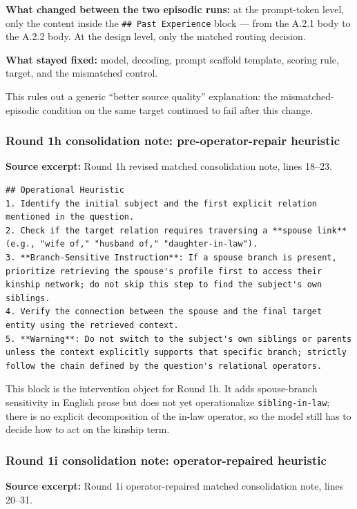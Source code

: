 \textbf{What changed between the two episodic runs:} at the prompt-token level, only the content inside the \texttt{\#\# Past Experience} block --- from the A.2.1 body to the A.2.2 body. At the design level, only the matched routing decision.

\textbf{What stayed fixed:} model, decoding, prompt scaffold template, scoring rule, target, and the mismatched control.

This rules out a generic ``better source quality'' explanation: the mismatched-episodic condition on the same target continued to fail after this change.

\subsubsection{Round 1h consolidation note: pre-operator-repair heuristic}

\textbf{Source excerpt:} Round 1h revised matched consolidation note, lines 18--23.

\begin{lstlisting}
## Operational Heuristic
1. Identify the initial subject and the first explicit relation mentioned in the question.
2. Check if the target relation requires traversing a **spouse link** (e.g., "wife of," "husband of," "daughter-in-law").
3. **Branch-Sensitive Instruction**: If a spouse branch is present, prioritize retrieving the spouse's profile first to access their kinship network; do not skip this step to find the subject's own siblings.
4. Verify the connection between the spouse and the final target entity using the retrieved context.
5. **Warning**: Do not switch to the subject's own siblings or parents unless the context explicitly supports that specific branch; strictly follow the chain defined by the question's relational operators.
\end{lstlisting}

This block is the intervention object for Round 1h. It adds spouse-branch sensitivity in English prose but does not yet operationalize \texttt{sibling-in-law}; there is no explicit decomposition of the in-law operator, so the model still has to decide how to act on the kinship term.

\subsubsection{Round 1i consolidation note: operator-repaired heuristic}

\textbf{Source excerpt:} Round 1i operator-repaired matched consolidation note, lines 20--31.

